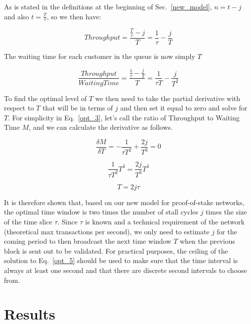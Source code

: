 \documentclass[conference]{IEEEtran}
\begin{document}
As is stated in the definitions at the beginning of Sec.~\ref{new_model},
$n=t-j$ and also $t = \frac{T}{\tau}$, so we then have:

\begin{equation}
  Throughput = \frac{\frac{T}{\tau}-j}{T}=\frac{1}{\tau}-\frac{j}{T}\label{opt_2}
\end{equation}

The waiting time for each customer in the queue is now simply $T$

\begin{equation}
  \frac{Throughput}{WaitingTime} = \frac{\frac{1}{\tau}-\frac{j}{T}}{T} = \frac{1}{\tau T}-\frac{j}{T^2}\label{opt_2}
\end{equation}

To find the optimal level of $T$ we then need to take the partial derivative with respect to $T$ that will
be in terms of $j$ and then set it equal to zero and solve for $T$. For simplicity in Eq.~\ref{opt_3}, 
let's call the ratio of Throughput to Waiting Time $M$, and we can calculate the derivative as follows.

\begin{equation}
  \frac{\delta M}{\delta T} = -\frac{1}{\tau T^2}+\frac{2j}{T^3}=0\label{opt_3}
\end{equation}

\begin{equation}
  \frac{1}{\tau T^2}T^3=\frac{2j}{T^3}T^3\label{opt_4}
\end{equation}

\begin{equation}
  T=2j\tau \label{opt_5}
\end{equation}

It is therefore shown that, based on our new model for proof-of-stake networks, the optimal 
time window is two times the number of stall cycles $j$ times the size of the time slice $\tau$.
Since $\tau$ is known and a technical requirement of the network (theoretical max transactions
per second), we only need to estimate $j$ for the coming period to then broadcast the next time 
window $T$ when the previous block is sent out to be validated. For practical purposes, the 
ceiling of the solution to Eq.~\ref{opt_5} should be used to make sure that the time interval is always at least one
second and that there are discrete second intervals to choose from.

\section{Results}
\end{document}
